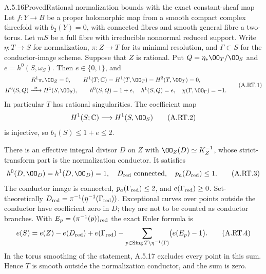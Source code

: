\begin{statement}{A.5.16}{Proved}{Rational normalization bounds with the exact constant-sheaf map}
Let $f:Y\to B$ be a proper holomorphic map from a smooth compact
complex threefold with $b_2(Y)=0$, with connected fibres and smooth
general fibre a two-torus. Let $mS$ be a full fibre with irreducible
nonnormal reduced support. Write $\eta:T\to S$ for normalization,
$\pi:Z\to T$ for its minimal resolution, and $\Gamma\subset S$
for the conductor-image scheme. Suppose that $Z$ is rational.
Put $Q=\eta_*\OO_T/\OO_S$ and $e=h^0(S,\omega_S)$.
Then $e\in\{0,1\}$, and
\[
\begin{gathered}
 R^1\pi_*\OO_Z=0,\qquad
 H^1(T;\mathbb C)=H^1(T,\OO_T)=H^2(T,\OO_T)=0,\\
 H^0(S,Q)\xrightarrow{\ \simeq\ }H^1(S,\OO_S),\qquad
 h^0(S,Q)=1+e,\quad h^1(S,Q)=e,\quad
 \chi(\Gamma,\OO_\Gamma)=-1.
\end{gathered}
\tag{A.RT.1}
\]
In particular $T$ has rational singularities. The coefficient map
\[
 H^1(S;\mathbb C)\longrightarrow H^1(S,\OO_S)
\tag{A.RT.2}
\]
is injective, so $b_1(S)\le1+e\le2$.

There is an effective integral divisor $D$ on $Z$ with
$\OO_Z(D)\simeq K_Z^{-1}$, whose strict-transform part is the
normalization conductor. It satisfies
\[
 h^0(D,\OO_D)=h^1(D,\OO_D)=1,
 \quad D_{\rm red}\text{ connected},
 \quad p_a(D_{\rm red})\le1.
\tag{A.RT.3}
\]
The conductor image is connected,
$p_a(\Gamma_{\rm red})\le2$, and
$e(\Gamma_{\rm red})\ge0$. Set-theoretically
$D_{\rm red}=\pi^{-1}(\eta^{-1}(\Gamma_{\rm red}))$.
Exceptional curves over points outside the conductor have
coefficient zero in $D$; they are not to be counted as conductor
branches. With $E_p=(\pi^{-1}(p))_{\rm red}$ the exact Euler
formula is
\[
 e(S)=e(Z)-e(D_{\rm red})+e(\Gamma_{\rm red})
       -\sum_{p\in\operatorname{Sing}T\setminus\eta^{-1}(\Gamma)}
                  \bigl(e(E_p)-1\bigr).
\tag{A.RT.4}
\]
In the torus smoothing of the statement, A.5.17 excludes
every point in this sum. Hence $T$ is smooth outside the
normalization conductor, and the sum is zero.
\end{statement}
